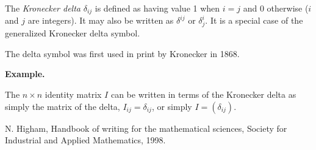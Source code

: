 \documentclass{article}
\begin{document}
The \emph{Kronecker delta} $\delta_{ij}$ is defined as having value 1 when $i=j$ and 0 otherwise ($i$ and $j$ are integers).  It may also be written as $\delta^{ij}$ or  $\delta^i_j$.  It is a special case of the generalized Kronecker delta symbol.

The delta symbol was first used in print by Kronecker in 1868\cite{Higham}. 

{\bf Example.}

The $n \times n$ identity matrix $I$ can be written in terms of the Kronecker delta as simply the matrix of the delta, $I_{ij}=\delta_{ij}$, or simply $I=(\delta_{ij})$.

\begin{thebibliography}{3}
 N. Higham, Handbook of writing for the mathematical sciences, Society for Industrial and Applied Mathematics, 1998. 
\end{thebibliography}
\end{document}
